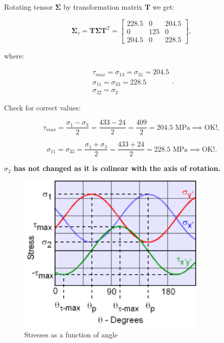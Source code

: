 \begin{itemize}
        Rotating tensor $\mathbf{\Sigma}$ by transformation matrix $\mathbf{T}$ we get:

        \begin{equation}
            \mathbf{\Sigma}_{\tau} = \mathbf{T}\mathbf{\Sigma}\mathbf{T}^{T}
            = \begin{bmatrix}
                228.5 & 0 & 204.5 \\
                0 & 125 & 0 \\
                204.5 & 0 & 228.5
            \end{bmatrix}
        ,\end{equation}

        where:

        \begin{equation}
            \begin{array}{l}
                \tau_{max} = \sigma_{13} = \sigma_{31} = 204.5 \\
                \sigma_{11} = \sigma_{33} = 228.5 \\
                \sigma_{22} = \sigma_2
            \end{array}
        .\end{equation}

        Check for correct values:

        \begin{equation}
            \tau_{max} = \frac{\sigma_1 - \sigma_3}{2} = \frac{433 - 24}{2}
            = \frac{409}{2} = 204.5 \text{ MPa} \implies \text{OK!}
        ,\end{equation}

        \begin{equation}
            \sigma_{11} = \sigma_{33} = \frac{\sigma_1 + \sigma_3}{2}
            = \frac{433 + 24}{2} = 228.5 \text{ MPa} \implies \text{OK!}
        .\end{equation}

        \textbf{$\sigma_2$ has not changed as it is colinear with the axis of rotation.}

        \begin{figure}[ht]
            \centering
            \includegraphics[width=0.8\textwidth]{img/stresses_as_function_of_angle}
            \caption{Stresses as a function of angle}
            \label{fig:stresses_as_function_of_angle-png}
        \end{figure}


\end{itemize}

